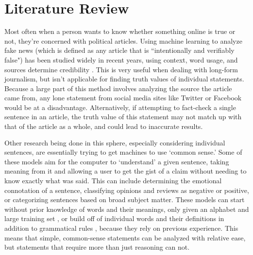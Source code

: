 \documentclass[]{article}
\begin{document}
		
	\section{Literature Review}
		
		
		Most often when a person wants to know whether something online is true or not, they're concerned with political articles. Using machine learning to analyze fake news (which is defined as any article that is ``intentionally and verifiably false") has been studied widely in recent years, using context, word usage, and sources determine credibility \cite{shu19}. This is very useful when dealing with long-form journalism, but isn't applicable for finding truth values of individual statements. Because a large part of this method involves analyzing the source the article came from, any lone statement from social media sites like Twitter or Facebook would be at a disadvantage. Alternatively, if attempting to fact-check a single sentence in an article, the truth value of this statement may not match up with that of the article as a whole, and could lead to inaccurate results. 
		
		Other research being done in this sphere, especially considering individual sentences, are essentially trying to get machines to use `common sense.' Some of these models aim for the computer to `understand' a given sentence, taking meaning from it and allowing a user to get the gist of a claim without needing to know exactly what was said. This can include determining the emotional connotation of a sentence, classifying opinions and reviews as negative or positive, or categorizing sentences based on broad subject matter. These models can start without prior knowledge of words and their meanings, only given an alphabet and large training set \cite{zhang15}, or build off of individual words and their definitions in addition to grammatical rules \cite{wang05}, because they rely on previous experience. This means that simple, common-sense statements can be analyzed with relative ease, but statements that require more than just reasoning can not.
		
\end{document}
